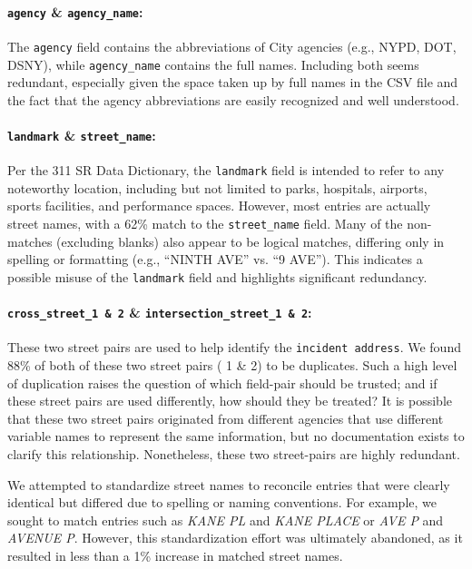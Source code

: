 \documentclass[linenumber]{jdsart}
\begin{document}
\paragraph{\texttt{agency} \& \texttt{agency\_name}:} The \texttt{agency} 
field contains the abbreviations of City agencies (e.g., NYPD, DOT, DSNY), 
while \texttt{agency\_name} contains the full names. Including both seems 
redundant, especially given the space taken up by full names in the 
CSV file and the fact that the agency abbreviations are 
easily recognized and well understood.

\paragraph{\texttt{landmark} \& \texttt{street\_name}:} Per the 
311 SR Data Dictionary, the \texttt{landmark} 
field is intended to refer to any noteworthy location, 
including but not limited to parks, hospitals, airports, sports facilities, 
and performance spaces. However, most entries are actually 
street names, with a 62\% match to the \texttt{street\_name} field. 
Many of the non-matches (excluding blanks) also appear to be 
logical matches, differing only in spelling or formatting 
(e.g., ``NINTH AVE'' vs. ``9 AVE''). This indicates a possible 
misuse of the \texttt{landmark} field and highlights significant
redundancy. 

\paragraph{\texttt{cross\_street\_1 \& 2} \& \texttt{intersection\_street\_1 \& 2}:} These 
two street pairs are used to help identify the 
\texttt{incident address}. We found 88\% of both of these two 
street pairs ( 1 \& 2) to be duplicates. Such a high level of duplication 
raises the question of which field-pair should be trusted; 
and if these street pairs are used differently, how should they be treated?
It is possible that these two street pairs originated from different 
agencies that use different variable names to represent the same 
information, but no documentation exists to clarify this 
relationship. Nonetheless, these two street-pairs are highly redundant.


We attempted to standardize street names to reconcile entries that
were clearly identical but differed due to spelling or naming
conventions. For example, we sought to match entries such as
\textit{KANE PL} and \textit{KANE PLACE} or \textit{AVE P} and
\textit{AVENUE P}. However, this standardization effort was
ultimately abandoned, as it resulted in less than a 1\% increase in
matched street names.
\end{document}
